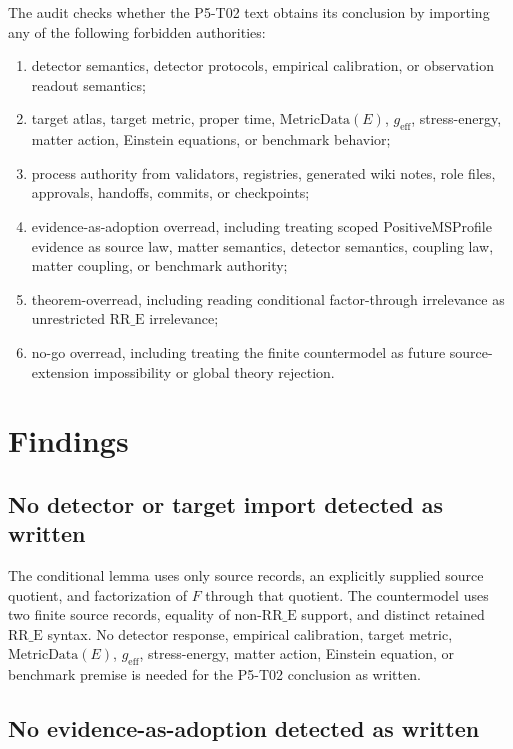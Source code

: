 \documentclass[11pt]{article}
\newcommand{\RRE}{\mathrm{RR\_E}}
\newcommand{\MetricData}{\mathrm{MetricData}(E)}
\newcommand{\geff}{g_{\mathrm{eff}}}
\begin{document}
The audit checks whether the P5-T02 text obtains its conclusion by importing
any of the following forbidden authorities:
\begin{enumerate}[label=(\arabic*)]
  \item detector semantics, detector protocols, empirical calibration, or
  observation readout semantics;
  \item target atlas, target metric, proper time, \(\MetricData\), \(\geff\),
  stress-energy, matter action, Einstein equations, or benchmark behavior;
  \item process authority from validators, registries, generated wiki notes,
  role files, approvals, handoffs, commits, or checkpoints;
  \item evidence-as-adoption overread, including treating scoped
  PositiveMSProfile evidence as source law, matter semantics, detector
  semantics, coupling law, matter coupling, or benchmark authority;
  \item theorem-overread, including reading conditional factor-through
  irrelevance as unrestricted \(\RRE\) irrelevance;
  \item no-go overread, including treating the finite countermodel as future
  source-extension impossibility or global theory rejection.
\end{enumerate}

\section{Findings}

\subsection{No detector or target import detected as written}

The conditional lemma uses only source records, an explicitly supplied
source quotient, and factorization of \(F\) through that quotient.  The
countermodel uses two finite source records, equality of non-\(\RRE\) support,
and distinct retained \(\RRE\) syntax.  No detector response, empirical
calibration, target metric, \(\MetricData\), \(\geff\), stress-energy,
matter action, Einstein equation, or benchmark premise is needed for the
P5-T02 conclusion as written.

\subsection{No evidence-as-adoption detected as written}
\end{document}
